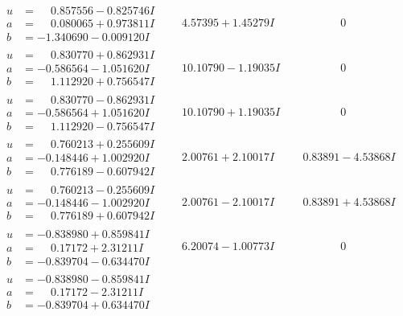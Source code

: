 \documentclass[1p]{elsarticle_modified}
\theoremstyle{definition}
\begin{document}
$$\begin{array}{c|c|c}
\begin{aligned}
u &= \phantom{-}0.857556 - 0.825746 I \\
a &= \phantom{-}0.080065 + 0.973811 I \\
b &= -1.340690 - 0.009120 I\end{aligned}
 & \phantom{-}4.57395 + 1.45279 I & \phantom{-0.000000 } 0 \\ \hline\begin{aligned}
u &= \phantom{-}0.830770 + 0.862931 I \\
a &= -0.586564 - 1.051620 I \\
b &= \phantom{-}1.112920 + 0.756547 I\end{aligned}
 & \phantom{-}10.10790 - 1.19035 I & \phantom{-0.000000 } 0 \\ \hline\begin{aligned}
u &= \phantom{-}0.830770 - 0.862931 I \\
a &= -0.586564 + 1.051620 I \\
b &= \phantom{-}1.112920 - 0.756547 I\end{aligned}
 & \phantom{-}10.10790 + 1.19035 I & \phantom{-0.000000 } 0 \\ \hline\begin{aligned}
u &= \phantom{-}0.760213 + 0.255609 I \\
a &= -0.148446 + 1.002920 I \\
b &= \phantom{-}0.776189 - 0.607942 I\end{aligned}
 & \phantom{-}2.00761 + 2.10017 I & \phantom{-}0.83891 - 4.53868 I \\ \hline\begin{aligned}
u &= \phantom{-}0.760213 - 0.255609 I \\
a &= -0.148446 - 1.002920 I \\
b &= \phantom{-}0.776189 + 0.607942 I\end{aligned}
 & \phantom{-}2.00761 - 2.10017 I & \phantom{-}0.83891 + 4.53868 I \\ \hline\begin{aligned}
u &= -0.838980 + 0.859841 I \\
a &= \phantom{-}0.17172 + 2.31211 I \\
b &= -0.839704 - 0.634470 I\end{aligned}
 & \phantom{-}6.20074 - 1.00773 I & \phantom{-0.000000 } 0 \\ \hline\begin{aligned}
u &= -0.838980 - 0.859841 I \\
a &= \phantom{-}0.17172 - 2.31211 I \\
b &= -0.839704 + 0.634470 I\end{aligned}

\end{array}$$
\end{document}
